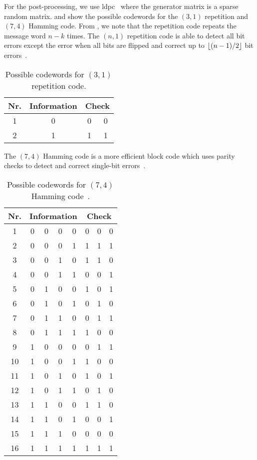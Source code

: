 For the post-processing, we use \gls{ldpc}~\cite{Gallager1962} where the generator matrix is a sparse random matrix.
 and  show the possible codewords for the $(3,1)$ repetition and $(7,4)$ Hamming code.
From , we note that the repetition code repeats the message word $n-k$ times.
The $(n,1)$ repetition code is able to detect all bit errors except the error when all bits are flipped and correct up to $\lfloor(n-1)/2\rfloor$ bit errors~\cite[p.~5]{MacKay2003}.
\begin{table}[htb]
	\centering
	\begin{tabular}{c|c|cc}
		\toprule
		Nr. & Information & \multicolumn{2}{c}{Check} \\
		\midrule
			1 & 0 & 0 & 0 \\
			2 & 1 & 1 & 1 \\
		\bottomrule
	\end{tabular}
	\caption{Possible codewords for $(3,1)$ repetition code.}\label{tab:repetition_codewords}
\end{table}
The $(7,4)$ Hamming code is a more efficient block code which uses parity checks to detect and correct single-bit errors~\cite[p.~10]{MacKay2003}.
\begin{table}[htb]
	\centering
	\begin{tabular}{c|cccc|ccc}
		\toprule
		Nr. & \multicolumn{4}{c}{Information} & \multicolumn{3}{c}{Check} \\
		\midrule
			1 & 0 & 0 & 0 & 0 & 0 & 0 & 0 \\
			2 & 0 & 0 & 0 & 1 & 1 & 1 & 1 \\
			3 & 0 & 0 & 1 & 0 & 1 & 1 & 0 \\
			4 & 0 & 0 & 1 & 1 & 0 & 0 & 1 \\
			5 & 0 & 1 & 0 & 0 & 1 & 0 & 1 \\
			6 & 0 & 1 & 0 & 1 & 0 & 1 & 0 \\
			7 & 0 & 1 & 1 & 0 & 0 & 1 & 1 \\
			8 & 0 & 1 & 1 & 1 & 1 & 0 & 0 \\
			9 & 1 & 0 & 0 & 0 & 0 & 1 & 1 \\
			10 & 1 & 0 & 0 & 1 & 1 & 0 & 0 \\
			11 & 1 & 0 & 1 & 0 & 1 & 0 & 1 \\
			12 & 1 & 0 & 1 & 1 & 0 & 1 & 0 \\
			13 & 1 & 1 & 0 & 0 & 1 & 1 & 0 \\
			14 & 1 & 1 & 0 & 1 & 0 & 0 & 1 \\
			15 & 1 & 1 & 1 & 0 & 0 & 0 & 0 \\
			16 & 1 & 1 & 1 & 1 & 1 & 1 & 1 \\
		\bottomrule
	\end{tabular}
	\caption{Possible codewords for $(7,4)$ Hamming code~\cite[p.~109]{Mildenberger2013}.}\label{tab:hamming_codewords}
\end{table}
